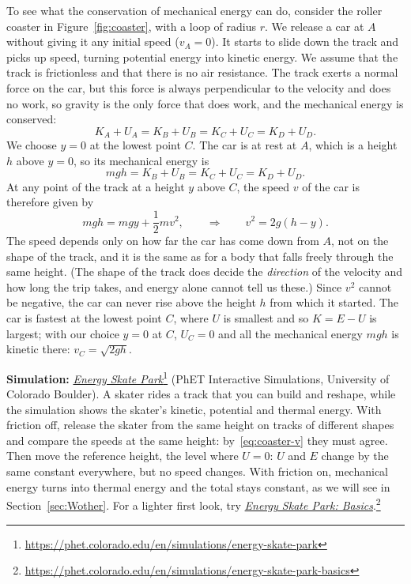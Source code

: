 \documentclass[11pt,a4paper]{article}
\begin{document}
To see what the conservation of mechanical energy can do, consider the roller coaster in
Figure~\ref{fig:coaster}, with a loop of radius $r$. We release a car at $A$ without giving it any
initial speed ($v_A = 0$). It starts to slide down the track and picks up speed, turning potential
energy into kinetic energy. We assume that the track is frictionless and that
there is no air resistance. The track exerts a normal force on the car, but this force is always
perpendicular to the velocity and does no work, so gravity is the only force that does work, and
the mechanical energy is conserved:
\begin{equation}\label{eq:coaster-E}
  K_A + U_A = K_B + U_B = K_C + U_C = K_D + U_D .
\end{equation}
We choose $y = 0$ at the lowest point $C$. The car is at rest at $A$, which is a height $h$ above
$y = 0$, so its mechanical energy is
\begin{equation}\label{eq:coaster-E2}
  mgh = K_B + U_B = K_C + U_C = K_D + U_D .
\end{equation}
At any point of the track at a height $y$ above $C$, the speed $v$ of the car is therefore given by
\begin{equation}\label{eq:coaster-v}
  mgh = mgy + \frac12 mv^2 , \qquad\Rightarrow\qquad v^2 = 2g(h - y) .
\end{equation}
The speed depends only on how far the car has come down from $A$, not on the shape of the track,
and it is the same as for a body that falls freely through the same height. (The shape of the
track does decide the \emph{direction} of the velocity and how long the trip takes, and energy alone
cannot tell us these.) Since $v^2$ cannot be negative, the car can never rise above the height $h$
from which it started. The car is fastest at the lowest point $C$, where $U$ is smallest and so
$K = E - U$ is largest; with our choice $y = 0$ at $C$, $U_C = 0$ and all the mechanical energy
$mgh$ is kinetic there: $v_C = \sqrt{2gh}$.

\begin{aside}
\textbf{Simulation:}
\href{https://phet.colorado.edu/en/simulations/energy-skate-park}{\emph{Energy Skate
Park}}\footnote{\url{https://phet.colorado.edu/en/simulations/energy-skate-park}} (PhET Interactive
Simulations, University of Colorado Boulder). A skater rides a track that you can build and
reshape, while the simulation shows the skater's kinetic, potential and thermal energy. With
friction off, release the skater from the same height on tracks of different shapes and compare
the speeds at the same height: by~\eqref{eq:coaster-v} they must agree. Then move the reference
height, the level where $U = 0$: $U$ and $E$ change by the same constant everywhere, but no speed
changes. With friction on, mechanical energy turns into thermal energy and the total stays
constant, as we will see in Section~\ref{sec:Wother}. For a lighter first look, try
\href{https://phet.colorado.edu/en/simulations/energy-skate-park-basics}{\emph{Energy Skate Park:
Basics}}.\footnote{\url{https://phet.colorado.edu/en/simulations/energy-skate-park-basics}}
\end{aside}
\end{document}
